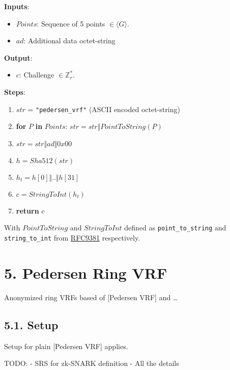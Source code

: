 \documentclass[
]{article}
\providecommand{\tightlist}{%
  \setlength{\itemsep}{0pt}\setlength{\parskip}{0pt}}
\begin{document}
\textbf{Inputs}:

\begin{itemize}
\tightlist
\item
  \(Points\): Sequence of 5 points \(\in \langle G \rangle\).
\item
  \(ad\): Additional data octet-string
\end{itemize}

\textbf{Output}:

\begin{itemize}
\tightlist
\item
  \(c\): Challenge \(\in \mathbb{Z}^*_r\).
\end{itemize}

\textbf{Steps}:

\begin{enumerate}
\def\labelenumi{\arabic{enumi}.}
\tightlist
\item
  \(str\) = \texttt{"pedersen\_vrf"} (ASCII encoded octet-string)
\item
  \textbf{for} \(P\) \textbf{in} \(Points\):
  \(str = str \Vert PointToString(P)\)
\item
  \(str = str \Vert ad \Vert 0x00\)
\item
  \(h = Sha512(str)\)
\item
  \(h_t = h[0] \Vert .. \Vert h[31]\)
\item
  \(c = StringToInt(h_t)\)
\item
  \textbf{return} \(c\)
\end{enumerate}

With \(PointToString\) and \(StringToInt\) defined as
\texttt{point\_to\_string} and \texttt{string\_to\_int} from
\href{https://datatracker.ietf.org/doc/rfc9381}{RFC9381} respectively.

\hypertarget{pedersen-ring-vrf}{%
\section{5. Pedersen Ring VRF}\label{pedersen-ring-vrf}}

Anonymized ring VRFs based of {[}Pedersen VRF{]} and \ldots{}

\hypertarget{setup-2}{%
\subsection{5.1. Setup}\label{setup-2}}

Setup for plain {[}Pedersen VRF{]} applies.

TODO: - SRS for zk-SNARK definition - All the details
\end{document}
